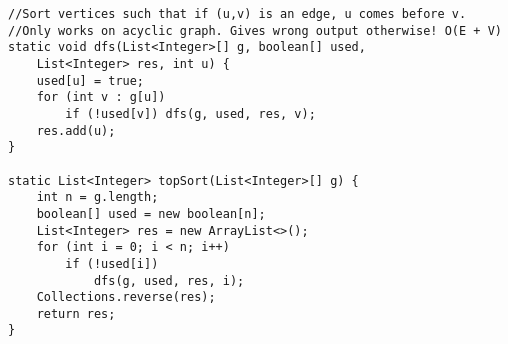 \begin{verbatim}
//Sort vertices such that if (u,v) is an edge, u comes before v.
//Only works on acyclic graph. Gives wrong output otherwise! O(E + V)
static void dfs(List<Integer>[] g, boolean[] used, 
	List<Integer> res, int u) {
	used[u] = true;
	for (int v : g[u])
		if (!used[v]) dfs(g, used, res, v);
	res.add(u);
}

static List<Integer> topSort(List<Integer>[] g) {
	int n = g.length;
	boolean[] used = new boolean[n];
	List<Integer> res = new ArrayList<>();
	for (int i = 0; i < n; i++)
		if (!used[i])
			dfs(g, used, res, i);
	Collections.reverse(res);
	return res;
}
\end{verbatim}